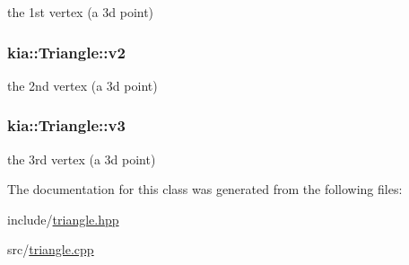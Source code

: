 the 1st vertex (a 3d point) 

\hypertarget{classkia_1_1Triangle_a276434ef57ec6b44ff922d64888c093a}{
\subsubsection[{v2}]{ kia\-::\-Triangle\-::v2}}\label{classkia_1_1Triangle_a276434ef57ec6b44ff922d64888c093a}


the 2nd vertex (a 3d point) 

\hypertarget{classkia_1_1Triangle_a2e1c6a9e3310076d86f48da54fa8f262}{
\subsubsection[{v3}]{ kia\-::\-Triangle\-::v3}}\label{classkia_1_1Triangle_a2e1c6a9e3310076d86f48da54fa8f262}


the 3rd vertex (a 3d point) 



The documentation for this class was generated from the following files\-:\begin{DoxyCompactItemize}
\item 
include/\hyperlink{triangle_8hpp}{triangle.\-hpp}\item 
src/\hyperlink{triangle_8cpp}{triangle.\-cpp}\end{DoxyCompactItemize}
